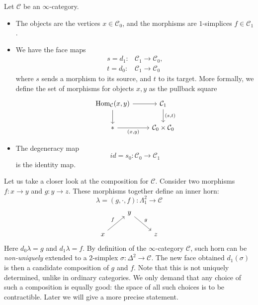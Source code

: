 Let \(\mathcal{C}\) be an \(\infty\)-category.
\begin{itemize}
    \item The objects are the vertices \(x\in \mathcal{C}_0\), and the morphisms are \(1\)-simplices \(f\in \mathcal{C}_1\).
    \item We have the face maps
          \begin{align*}
              s=d_1: & \mathcal{C}_1\rightarrow \mathcal{C}_0, \\
              t=d_0: & \mathcal{C}_1\rightarrow \mathcal{C}_0
          \end{align*}
          where \(s\) sends a morphism to its source, and \(t\) to its target. More formally, we define the set of morphisms for objects \(x,y\) as the pullback square
          \[\begin{tikzcd}
                  {\hom_\mathcal{C}(x,y)} & {\mathcal{C}_1} \\
                  {*} & {\mathcal{C}_0\times\mathcal{C}_0}
                  \arrow[from=1-1, to=1-2]
                  \arrow[from=1-1, to=2-1]
                  \arrow["{(s,t)}", from=1-2, to=2-2]
                  \arrow["{(x,y)}"', from=2-1, to=2-2]
              \end{tikzcd}\]
    \item The degeneracy map 
          \[id=s_0:\mathcal{C}_0\rightarrow \mathcal{C}_1\]
          is the identity map.
\end{itemize}
Let us take a closer look at the composition for \(\mathcal{C}\). Consider two morphisms \(f:x\rightarrow y\) and \(g:y\rightarrow z\). These morphisms together define an inner horn:
\[\lambda=(g,\cdot,f):\Lambda^2_1\rightarrow \mathcal{C}\]
\[\begin{tikzcd}
        & y \\
        x && z
        \arrow["g", from=1-2, to=2-3]
        \arrow["f", from=2-1, to=1-2]
    \end{tikzcd}\]
Here \(d_0\lambda=g\) and \(d_1\lambda=f\). By definition of the \(\infty\)-category \(\mathcal{C}\), such horn can be \textit{non-uniquely} extended to a \(2\)-simplex \(\sigma:\Delta^2\rightarrow \mathcal{C}\). The new face obtained \(d_1(\sigma)\) is then a candidate composition of \(g\) and \(f\). Note that this is not uniquely determined, unlike in ordinary categories. We only demand that any choice of such a composition is equally good: the space of all such choices is to be contractible. Later we will give a more precise statement. 

